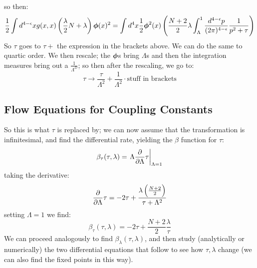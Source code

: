 so then:
\begin{equation}
    \frac{1}{2}\int d^{4-\e}x g(x, x)\left(\frac{\lambda}{2}N + \lambda\right)\gv{\phi}(x)^2 = \int d^4x \frac{1}{2}\gv{\phi}^2(x)\left(\frac{N+2}{2}\lambda \int_{\Lambda}^1 \frac{d^{4-\e}p}{(2\pi)^{4-\e}}\frac{1}{p^2 + \tau}\right)
\end{equation}
So $\tau$ goes to $\tau +$ the expression in the brackets above. We can do the same to quartic order. We then rescale; the $\gv{\phi}$s bring $\Lambda$s and then the integration measures bring out a $\frac{1}{\Lambda^D}$; so then after the rescaling, we go to:
\begin{equation}
    \tau \to \frac{\tau}{\Lambda^2} + \frac{1}{\Lambda^2}\cdot \text{stuff in brackets}
\end{equation}

\subsection{Flow Equations for Coupling Constants}
So this is what $\tau$ is replaced by; we can now assume that the transformation is infinitesimal, and find the differential rate, yielding the $\beta$ function for $\tau$:
\begin{equation}
    \beta_\tau(\tau, \lambda) = \left.\Lambda \frac{\partial }{\partial \Lambda}\tau \right|_{\Lambda = 1}
\end{equation}
taking the derivative:
\begin{equation}
    \frac{\partial }{\partial \Lambda}\tau = -2\tau + \frac{\lambda\left(\frac{N+2}{2}\right)}{\tau + \Lambda^2}
\end{equation}
setting $\Lambda = 1$ we find:
\begin{equation}
    \beta_\tau(\tau, \lambda) = -2\tau + \frac{N+2}{2}\frac{\lambda}{\tau}
\end{equation}
We can proceed analogously to find $\beta_\lambda(\tau, \lambda)$, and then study (analytically or numerically) the two differential equations that follow to see how $\tau, \lambda$ change (we can also find the fixed points in this way).

